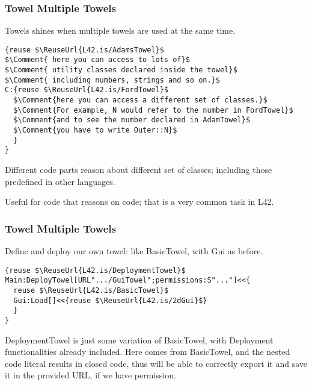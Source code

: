 \begin{frame}[fragile]
\frametitle{Towel Multiple Towels}

Towels shines when multiple towels are used at the same time.

\begin{NiceCode}{59ex}{1}
\begin{lstlisting}
{reuse $\ReuseUrl{L42.is/AdamsTowel}$
$\Comment{ here you can access to lots of}$
$\Comment{ utility classes declared inside the towel}$
$\Comment{ including numbers, strings and so on.}$
C:{reuse $\ReuseUrl{L42.is/FordTowel}$
  $\Comment{here you can access a different set of classes.}$
  $\Comment{For example, N would refer to the number in FordTowel}$
  $\Comment{and to see the number declared in AdamTowel}$
  $\Comment{you have to write Outer::N}$
  }
}
\end{lstlisting}
\end{NiceCode}

Different code parts reason about different set of classes;
including those predefined in other languages.

Useful for code that reasons on code; that is a very common task
in L42. 


\end{frame}
\begin{frame}[fragile]
\frametitle{Towel Multiple Towels}

Define and deploy our own towel: like BasicTowel, with Gui as before.
\begin{NiceCode}{59ex}{1}
\begin{lstlisting}
{reuse $\ReuseUrl{L42.is/DeploymentTowel}$
Main:DeployTowel[URL".../GuiTowel";permissions:S"..."]<<{
  reuse $\ReuseUrl{L42.is/BasicTowel}$
  Gui:Load[]<<{reuse $\ReuseUrl{L42.is/2dGui}$}
  }
}
\end{lstlisting}
\end{NiceCode}
DeploymentTowel is just some variation of BasicTowel, with Deployment
functionalities already included.
Here \Q@Load@ comes from BasicTowel, and the nested code literal
results in closed code, thus \Q@Deploy@ will be able to correctly
export it and save it in the provided URL, if we have permission.

\end{frame}
